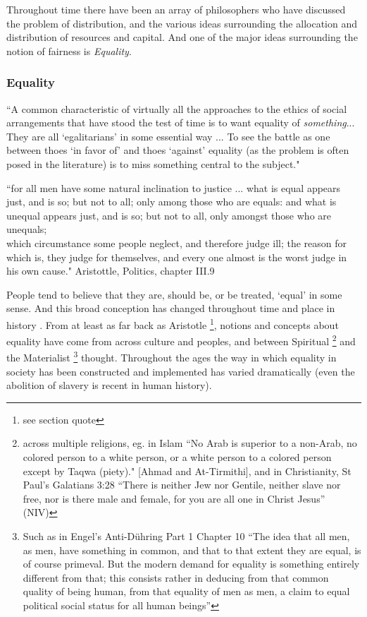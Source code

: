Throughout time there have been an array of philosophers who have discussed the problem of distribution, and the various ideas surrounding the allocation and distribution of resources and capital. And one of the major ideas surrounding the notion of fairness is \textit{Equality}.

\subsubsection{Equality}

\begin{displayquote}
``A common characteristic of virtually all the approaches to the ethics of social arrangements that have stood the test of time is to want equality of \textit{something}... They are all `egalitarians' in some essential way ... To see the battle as one between thoes `in favor of' and thoes `against' equality (as the problem is often posed in the literature) is to miss something central to the subject."\cite{18084} 
\end{displayquote}

\begin{displayquote}
``for all men have some natural inclination to justice ... what is equal appears just, and is so; but not to all; only among those who are equals: and what is unequal appears just, and is so; but not to all, only amongst those who are unequals;\\
which circumstance some people neglect, and therefore judge ill; the reason for which is, they judge for themselves, and every one almost is the worst judge in his own cause." Aristottle, Politics, chapter III.9\cite{AristotleGutenberg}
\end{displayquote}



People tend to believe that they are, should be, or be treated, `equal' in some sense.
And this broad conception has changed throughout time and place in history \cite{themeaningofequalitycapaldi}.
From at least as far back as Aristotle \cite{AristotleGutenberg}\footnote{see section quote}, notions and concepts about equality have come from across culture and peoples, and between Spiritual \footnote{across multiple religions, eg. in Islam ``No Arab is superior to a non-Arab, no colored person to a  white person, or a white person to a colored person except by Taqwa (piety)." [Ahmad and At-Tirmithi], and in Christianity, St Paul's Galatians 3:28 ``There is neither Jew nor Gentile, neither slave nor free, nor is there male and female, for you are all one in Christ Jesus'' (NIV) } and the Materialist \footnote{Such as in Engel's Anti-D\"{u}hring Part 1 Chapter 10 ``The idea that all men, as men, have something in common, and that to that extent they are equal, is of course primeval. But the modern demand for equality is something entirely different from that; this consists rather in deducing from that common quality of being human, from that equality of men as men, a claim to equal political social status for all human beings''} thought.
Throughout the ages the way in which equality in society has been constructed and implemented has varied dramatically (even the abolition of slavery is recent in human history).

